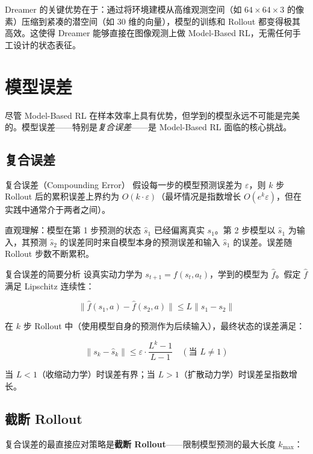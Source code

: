 Dreamer 的关键优势在于：通过将环境建模从高维观测空间（如 $64 \times 64 \times 3$ 的像素）压缩到紧凑的潜空间（如 $30$ 维的向量），模型的训练和 Rollout 都变得极其高效。这使得 Dreamer 能够直接在图像观测上做 Model-Based RL，无需任何手工设计的状态表征。

\section{模型误差}

尽管 Model-Based RL 在样本效率上具有优势，但学到的模型永远不可能是完美的。模型误差——特别是\emph{复合误差}——是 Model-Based RL 面临的核心挑战。

\subsection{复合误差}

\begin{mydefinition}{复合误差（Compounding Error）}
假设每一步的模型预测误差为 $\varepsilon$，则 $k$ 步 Rollout 后的累积误差上界约为 $O(k \cdot \varepsilon)$（最坏情况是指数增长 $O(e^k \varepsilon)$，但在实践中通常介于两者之间）。

直观理解：模型在第 1 步预测的状态 $\hat{s}_1$ 已经偏离真实 $s_1$。第 2 步模型以 $\hat{s}_1$ 为输入，其预测 $\hat{s}_2$ 的误差同时来自模型本身的预测误差和输入 $\hat{s}_1$ 的误差。误差随 Rollout 步数不断累积。
\end{mydefinition}

\begin{myTheorem}{复合误差的简要分析}
设真实动力学为 $s_{t+1} = f(s_t, a_t)$，学到的模型为 $\hat{f}$。假定 $\hat{f}$ 满足 Lipschitz 连续性：

\[
\|\hat{f}(s_1, a) - \hat{f}(s_2, a)\| \le L \|s_1 - s_2\|
\]

在 $k$ 步 Rollout 中（使用模型自身的预测作为后续输入），最终状态的误差满足：

\[
\|s_k - \hat{s}_k\| \le \varepsilon \cdot \frac{L^k - 1}{L - 1} \quad (\text{当 } L \neq 1)
\]

当 $L < 1$（收缩动力学）时误差有界；当 $L > 1$（扩散动力学）时误差呈指数增长。
\end{myTheorem}

\subsection{截断 Rollout}

复合误差的最直接应对策略是\textbf{截断 Rollout}——限制模型预测的最大长度 $k_{\max}$：

